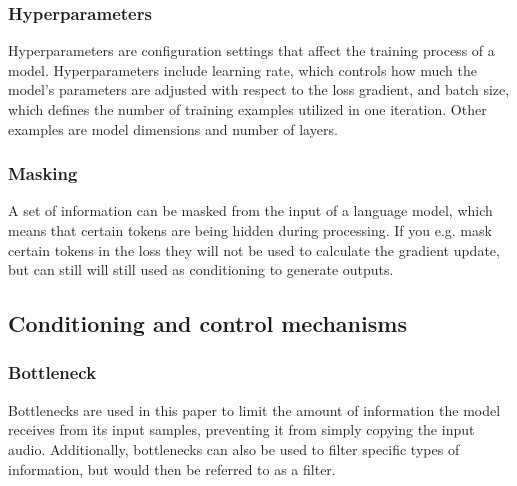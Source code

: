 \documentclass[a4paper,12pt,twoside]{article}
\newenvironment{aigen}{\begin{tcolorbox}[colback=blue!5!white, colframe=blue!75!black, title=AI-Generated Section]}{\end{tcolorbox}}
\begin{document}
\subsubsection*{Hyperparameters}\label{sec:Hyperparameters}

Hyperparameters are configuration settings that affect the training process of a model. Hyperparameters include learning rate, which controls how much the model's parameters are adjusted with respect to the loss gradient, and batch size, which defines the number of training examples utilized in one iteration. Other examples are model dimensions and number of layers.

\subsubsection*{Masking}\label{sec:masking}

A set of information can be masked from the input of a language model, which means that certain tokens are being hidden during processing. If you e.g. mask certain tokens in the loss they will not be used to calculate the gradient update, but can still will still used as conditioning to generate outputs.

\subsection{Conditioning and control mechanisms}

\subsubsection*{Bottleneck}\label{sec:Bottleneck}

Bottlenecks are used in this paper to limit the amount of information the model receives from  its input samples, preventing it from simply copying the input audio. Additionally, bottlenecks can also be used to filter specific types of information, but would then be referred to as a filter.
\end{document}
